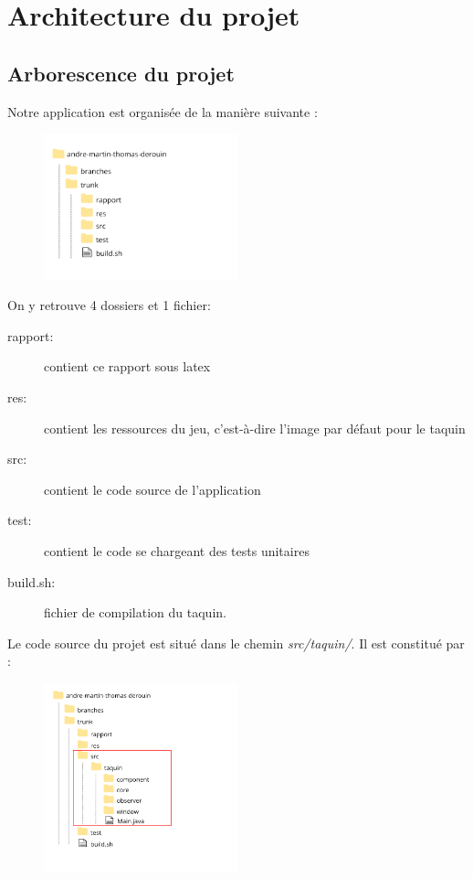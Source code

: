 \chapter{Architecture du projet}

	\section{Arborescence du projet}

		Notre application est organisée de la manière suivante :


		\begin{figure}[H]
			\centering
			\includegraphics[width=0.5\textwidth, keepaspectratio]{img/racine.png}
		\end{figure}

		On y retrouve 4 dossiers et 1 fichier:

		\begin{description}
			\item [rapport:] contient ce rapport sous latex
			\item [res:] contient les ressources du jeu, c'est-à-dire l’image par défaut pour le taquin
			\item [src:] contient le code source de l’application
			\item [test:] contient le code se chargeant des tests unitaires
			\item [build.sh:] fichier de compilation du taquin.
		\end{description}

		Le code source du projet est situé dans le chemin \textit{src/taquin/}. Il est constitué par :

		\begin{figure}[H]
			\centering
			\includegraphics[width=0.5\textwidth, keepaspectratio]{img/detail.png}
		\end{figure}

